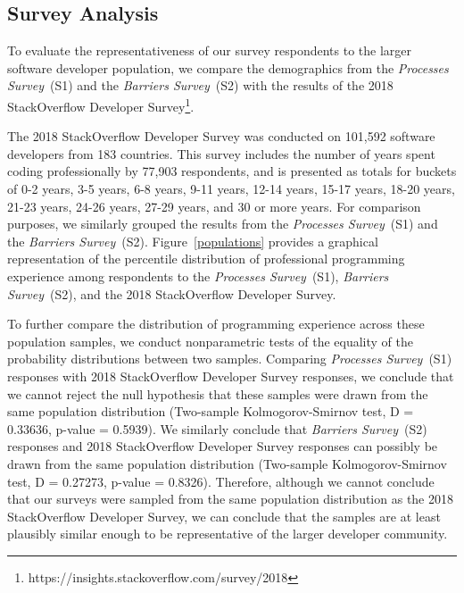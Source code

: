 \subsection{Survey Analysis}\label{analysis}
To evaluate the representativeness of our survey respondents to the larger software developer population, we compare the demographics from the \textit{Processes Survey}~(S1) and the \textit{Barriers Survey}~(S2) with the results of the 2018 StackOverflow Developer Survey\footnote{https://insights.stackoverflow.com/survey/2018}.

The 2018 StackOverflow Developer Survey was conducted on 101,592 software developers from 183 countries.
This survey includes the number of years spent coding professionally by 77,903 respondents, and is presented as totals for buckets of 0-2 years, 3-5 years, 6-8 years, 9-11 years, 12-14 years, 15-17 years, 18-20 years, 21-23 years, 24-26 years, 27-29 years, and 30 or more years.
For comparison purposes, we similarly grouped the results from the \textit{Processes Survey}~(S1) and the \textit{Barriers Survey}~(S2).
Figure~\ref{populations} provides a graphical representation of the percentile distribution of professional programming experience among respondents to the \textit{Processes Survey}~(S1), \textit{Barriers Survey}~(S2), and the 2018 StackOverflow Developer Survey.

To further compare the distribution of programming experience across these population samples, we conduct nonparametric tests of the equality of the probability distributions between two samples.
Comparing \textit{Processes Survey}~(S1) responses with 2018 StackOverflow Developer Survey responses, we conclude that we cannot reject the null hypothesis that these samples were drawn from the same population distribution (Two-sample Kolmogorov-Smirnov test, D = 0.33636, p-value = 0.5939).
We similarly conclude that \textit{Barriers Survey}~(S2) responses and 2018 StackOverflow Developer Survey responses can possibly be drawn from the same population distribution (Two-sample Kolmogorov-Smirnov test, D = 0.27273, p-value = 0.8326).
Therefore, although we cannot conclude that our surveys were sampled from the same population distribution as the 2018 StackOverflow Developer Survey, we can conclude that the samples are at least plausibly similar enough to be representative of the larger developer community. 

